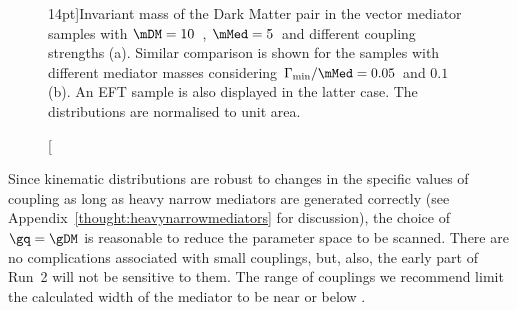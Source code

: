 \begin{figure}
\centering
{}
\hfill
{}
\caption[][14pt]{Invariant mass of the Dark Matter pair in the vector mediator samples with $\mDM=10$~\gev, $\mMed=5$~\tev and different coupling strengths (a).
Similar comparison is shown for the samples with different mediator masses considering $\Gamma_{\rm{min}}/\mMed=0.05$ and $0.1$ (b).
An EFT sample is also displayed in the latter case. The distributions are normalised to unit area.}
\label{fig:monojet_mchichi}
\end{figure}


Since kinematic distributions are robust to
changes in the specific values of coupling as long as heavy narrow mediators are generated correctly (see Appendix~\ref{thought:heavynarrowmediators} for discussion), 
the choice of $\gq=\gDM$ is reasonable 
to reduce the parameter space to be scanned. 
There are no complications associated
with small couplings, but, also, the early part of Run~2 will not be
sensitive to them.  The range of couplings we recommend limit the
calculated width of the mediator to be near or below \mMed.

